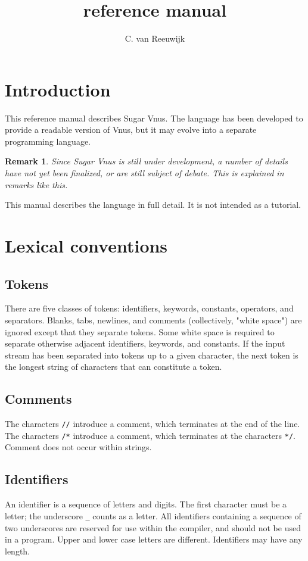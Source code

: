 \documentclass[a4paper]{article}
\title{{\langnm} reference manual}
\author{C. van Reeuwijk}
\newcommand{\langnm}{Sugar Vnus}
\newtheorem{remark}{Remark}
\begin{document}
\maketitle
\section{Introduction}
This reference manual describes {\langnm}. The language has been developed to
provide a readable version of Vnus, but it may evolve into a separate
programming language.
\par
\begin{remark}
Since {\langnm} is still under development, a number of details have
not yet been finalized, or are still subject of debate. This is
explained in remarks like this.
\end{remark}
\par
This manual describes the language in full detail. It is not intended
as a tutorial.

\section{Lexical conventions}
\subsection{Tokens}
There are five classes of tokens: identifiers, keywords, constants,
operators, and separators.
Blanks, tabs, newlines, and comments (collectively,
"white space") are ignored except that they separate tokens.
Some white space is required to separate otherwise adjacent identifiers,
keywords, and constants.
If the input stream has been separated into tokens up to a given character,
the next token is the longest string of characters that can constitute
a token.
\subsection{Comments}
The characters \verb"//" introduce a comment, which terminates at the end
of the line.
The characters \verb"/*" introduce a comment, which terminates at the
characters \verb"*/".
Comment does not occur within strings.
\subsection{Identifiers}
An identifier is a sequence of letters and digits. The first character
must be a letter; the underscore \verb"_" counts as a letter.
All identifiers containing a sequence of two underscores are reserved for
use within the compiler, and should not be used in a program.
Upper and lower case letters are different. Identifiers may have any
length.
\end{document}
